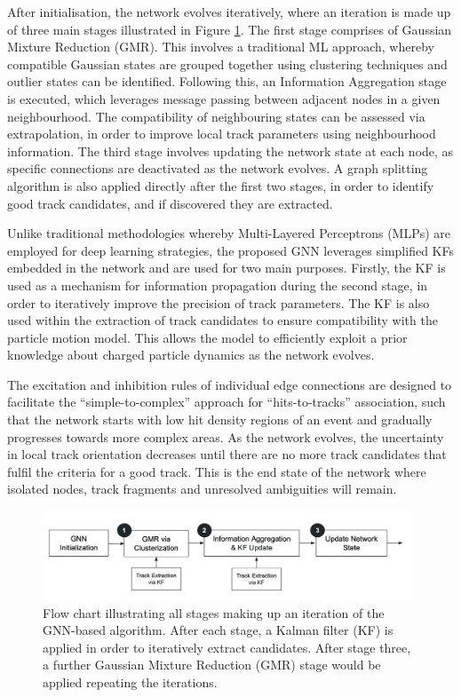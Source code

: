 After initialisation, the network evolves iteratively, where an iteration is made up of three main stages illustrated in Figure \ref{fig:flowchart}. The first stage comprises of Gaussian Mixture Reduction (GMR). This involves a traditional ML approach, whereby compatible Gaussian states are grouped together using clustering techniques and outlier states can be identified. Following this, an Information Aggregation stage is executed, which leverages message passing between adjacent nodes in a given neighbourhood. The compatibility of neighbouring states can be assessed via extrapolation, in order to improve local track parameters using neighbourhood information. The third stage involves updating the network state at each node, as specific connections are deactivated as the network evolves. A graph splitting algorithm is also applied directly after the first two stages, in order to identify good track candidates, and if discovered they are extracted. 

Unlike traditional methodologies whereby Multi-Layered Perceptrons (MLPs) are employed for deep learning strategies, the proposed GNN leverages simplified KFs embedded in the network and are used for two main purposes. Firstly, the KF is used as a mechanism for information propagation during the second stage, in order to iteratively improve the precision of track parameters. The KF is also used within the extraction of track candidates to ensure compatibility with the particle motion model. This allows the model to efficiently exploit a prior knowledge about charged particle dynamics as the network evolves.

The excitation and inhibition rules of individual edge connections are designed to facilitate the “simple-to-complex” approach for “hits-to-tracks” association, such that the network starts with low hit density regions of an event and gradually progresses towards more complex areas. As the network evolves, the uncertainty in local track orientation decreases until there are no more track candidates that fulfil the criteria for a good track. This is the end state of the network where isolated nodes, track fragments and unresolved ambiguities will remain.

\begin{figure}[htbp]
    \centering
    \includegraphics[width=0.98\textwidth]{images/5-gnn-algorithm/gnn-workflow.png}
    \caption{Flow chart illustrating all stages making up an iteration of the GNN-based algorithm. After each stage, a Kalman filter (KF) is applied in order to iteratively extract candidates. After stage three, a further Gaussian Mixture Reduction (GMR) stage would be applied repeating the iterations.}
    \label{fig:flowchart}%
\end{figure}



